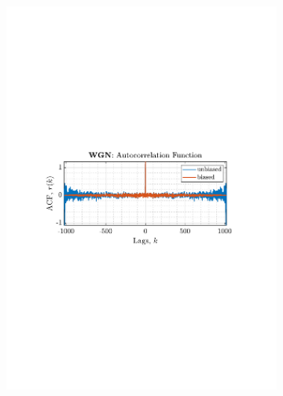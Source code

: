 \documentclass[12pt]{article}
\numberwithin{equation}{section}
\begin{document}
\begin{figure}[H]
\begin{subfigure}{0.49\textwidth}
			\includegraphics[trim={2.2cm 11.2cm 3.15cm  11.2cm}, clip, width=\textwidth]{../MATLAB/figures/q1_3a_fig02.pdf} 
		\end{subfigure}
		\begin{subfigure}{0.49\textwidth}
			\centering

\end{subfigure}
\end{figure}
\end{document}
